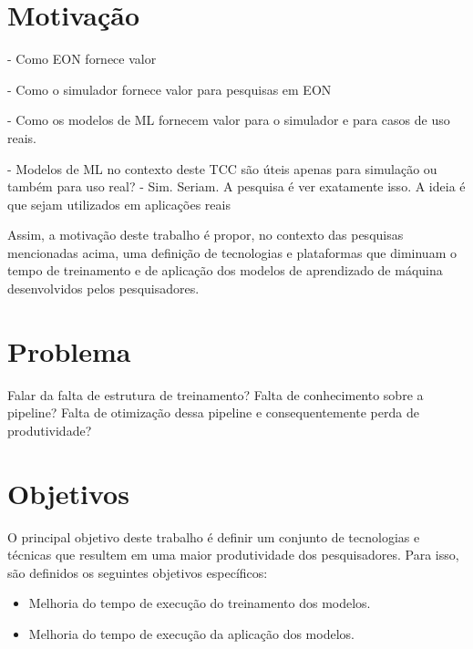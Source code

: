 \section{Motivação}%

- Como EON fornece valor

- Como o simulador fornece valor para pesquisas em EON

- Como os modelos de ML fornecem valor para o simulador e para casos de uso reais.

- Modelos de ML no contexto deste TCC são úteis apenas para simulação ou também para uso real?
- Sim. Seriam. A pesquisa é ver exatamente isso. A ideia é que sejam utilizados em aplicações reais

Assim, a motivação deste trabalho é propor, no contexto das pesquisas mencionadas acima, uma definição de tecnologias e plataformas que diminuam o tempo de treinamento e de aplicação dos modelos de aprendizado de máquina desenvolvidos pelos pesquisadores.

\section{Problema}%



Falar da falta de estrutura de treinamento? Falta de conhecimento sobre a pipeline?
Falta de otimização dessa pipeline e consequentemente perda de produtividade?

\section{Objetivos}%

O principal objetivo deste trabalho é definir um conjunto de tecnologias e técnicas que resultem em uma maior produtividade dos pesquisadores. Para isso, são definidos os seguintes objetivos específicos:

\begin{itemize}
  \item Melhoria do tempo de execução do treinamento  dos modelos.
  \item Melhoria do tempo de execução da aplicação dos modelos.
\end{itemize}